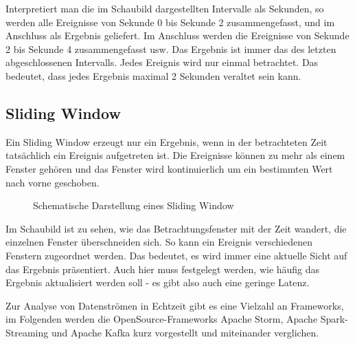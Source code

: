 \documentclass[a4paper,11pt]{scrartcl}
\begin{document}
  Interpretiert man die im Schaubild dargestellten Intervalle als
  Sekunden, so werden alle Ereignisse von Sekunde 0 bis Sekunde 2
  zusammengefasst, und im Anschluss als Ergebnis geliefert. Im
  Anschluss werden die Ereignisse von Sekunde 2 bis Sekunde 4
  zusammengefasst usw. Das Ergebnis ist immer das des letzten
  abgeschlossenen Intervalls. Jedes Ereignis wird nur einmal
  betrachtet. Das bedeutet, dass jedes Ergebnis maximal 2 Sekunden
  veraltet sein kann.

  \subsection{Sliding Window}
  Ein Sliding Window erzeugt nur ein Ergebnis, wenn in der
  betrachteten Zeit tatsächlich ein Ereignis aufgetreten ist. Die
  Ereignisse können zu mehr als einem Fenster gehören und das Fenster
  wird kontinuierlich um ein bestimmten Wert nach vorne geschoben.
  \begin{figure}[!h]
    \centering
    \caption{Schematische Darstellung eines Sliding Window}
  \end{figure}

  Im Schaubild ist zu sehen, wie das Betrachtungsfenster mit der Zeit
  wandert, die einzelnen Fenster überschneiden sich. So kann ein
  Ereignis verschiedenen Fenstern zugeordnet werden. Das bedeutet, es
  wird immer eine aktuelle Sicht auf das Ergebnis präsentiert. Auch
  hier muss festgelegt werden, wie häufig das Ergebnis aktualisiert
  werden soll - es gibt also auch eine geringe Latenz.



  Zur Analyse von Datenströmen in Echtzeit gibt es eine Vielzahl an Frameworks,
  im Folgenden werden die OpenSource-Frameworks Apache Storm, Apache
  Spark-Streaming und Apache Kafka kurz vorgestellt und miteinander verglichen.
\end{document}
